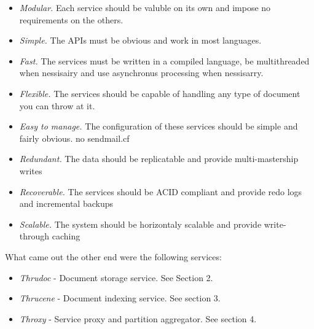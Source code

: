 \documentclass[nocopyrightspace,blockstyle]{sigplanconf}
\begin{document}
\begin{itemize}

\item\textit{Modular.} Each service should be valuble on its own and impose no requirements on the others.

\item\textit{Simple.} The APIs must be obvious and work in most languages.

\item\textit{Fast.} The services must be written in a compiled language, be multithreaded when nessisairy and use asynchronus processing when nessisarry.

\item\textit{Flexible.} The services should be capable of handling any type of document you can throw at it. 

\item\textit{Easy to manage.} The configuration of these services should be simple and fairly obvious. no sendmail.cf 

\item\textit{Redundant.} The data should be replicatable and provide multi-mastership writes

\item\textit{Recoverable.} The services should be ACID compliant and provide redo logs and incremental backups

\item\textit{Scalable.} The system should be horizontaly scalable and provide write-through caching  
\end{itemize}

What came out the other end were the following services:

\begin{itemize}
\item\textit{Thrudoc}   - Document storage service. See Section 2. 

\item\textit{Thrucene}  - Document indexing service. See section 3.

\item\textit{Throxy}    - Service proxy and partition aggregator. See section 4.
\end{itemize}
\end{document}
